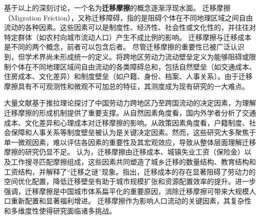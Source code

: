 \documentclass[a4paper, zihao=-4, fontset = mac, oneside]{ctexbook} %
\begin{document}
基于以上的深刻讨论，一个名为\textbf{迁移摩擦}的概念逐渐浮现水面。
迁移摩擦（Migration Friction），又称迁移障碍，指的是阻碍个体在不同地理区域之间自由流动的各种因素。这些因素可以是制度性、经济性、社会性或文化性的，并往往对特定群体（如农村向城市流动人口）产生不成比例的影响。
迁移摩擦与迁移成本是不同的两个概念，前者可以包含后者。
尽管迁移摩擦的重要性已被广泛认识到，但学术界尚未形成统一的定义。\textcite{JiangWeiZhongGuoKuaDiQuLaoDongLiLiuDongBiLeiCeDuFangFaYanJinQuShiYuJueDingYinSu2024}将跨地区劳动力流动壁垒定义为能够阻碍或限制个体在不同地理区域间自由流动的各类障碍总和，包括自然壁垒（如交通成本、住房成本、文化差异）和制度壁垒（如户籍、身份、档案、人事关系）。由于迁移摩擦具有不可观测性和微观不可加总的特征，其测度成为现有研究的一大难点。

大量文献基于推拉理论探讨了中国劳动力跨地区乃至跨国流动的决定因素，为理解迁移摩擦的形成机制提供了重要支撑。从自然因素角度看，国内外学者分析了交通成本、文化差异和心理成本对迁移摩擦的影响。从政策因素角度看，户籍制度、社会保障和人事关系等制度壁垒被认为是关键决定因素。然而，这些研究大多聚焦于单一微观因素，难以评估各因素的重要性及其宏观效应，导致从整体层面理解迁移摩擦的研究仍显不足。
\textcite{WangLiLiWoGuoRenKouQianYiChengBenChengShiGuiMoYuShengChanLu2020}认为，迁移摩擦由迁移成本、城镇失业工资（保险金）以及工作搜寻匹配摩擦组成，这些因素共同塑造了城乡迁移的数量结构、教育结构和工资结构，并解释了“迁移之谜”现象。\textcite{WangLiLiWoGuoRenKouQianYiChengBenChengShiGuiMoYuShengChanLu2020}指出，迁移成本的存在显著阻碍了劳动力的空间优化配置，降低迁移壁垒有助于城市规模扩张和资源配置效率的提升。\textcite{LiuXiuYanFangJieQianYiMoCaYuZhongGuoChengShiDeGuiMoFenBuLiLunMoXingYuJieGouShiGuJi2017}进一步强调，迁移摩擦是中国城市体系扁平化的重要原因，消除迁移摩擦可带来大规模人口重新配置和显著福利增进。
迁移摩擦作为影响人口流动的关键因素，其复杂性和多维度性使得研究面临诸多挑战。
\end{document}
